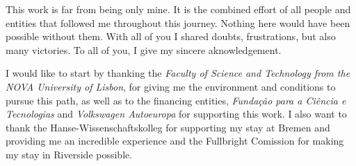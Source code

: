 
%

\begin{ntacknowledgements}

This work is far from being only mine. It is the combined effort of all people and entities that followed me throughout this journey. Nothing here would have been possible without them. With all of you I shared doubts, frustrations, but also many victories. To all of you, I give my sincere aknowledgement.

I would like to start by thanking the \textit{Faculty of Science and Technology from the NOVA University of Lisbon}, for giving me the environment and conditions to pursue this path, as well as to the financing entities, \textit{Fundação para a Ciência e Tecnologias} and \textit{Volkswagen Autoeuropa} for supporting this work. I also want to thank the Hanse-Wissenschaftskolleg for supporting my stay at Bremen and providing me an incredible experience and the Fullbright Comission for making my stay in Riverside possible.


\end{ntacknowledgements}
